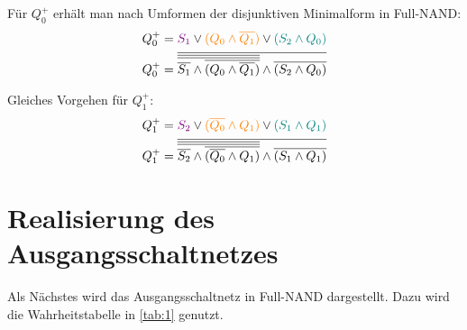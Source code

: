 \documentclass[
    paper=a4,
]{scrartcl}
\begin{document}
    \vspace*{1em}

    Für \(Q_0^+\) erhält man nach Umformen der disjunktiven Minimalform in Full-NAND:
    \begin{align*}
        Q_0^+ &= \textcolor{violet}{S_1} \vee \textcolor{orange}{(Q_0 \wedge \overline{Q_1})} \vee \textcolor{teal}{(S_2 \wedge Q_0)}\\
        Q_0^+ &= \overline{ \overline{\overline{\overline{S_1} \wedge \overline{ (Q_0 \wedge \overline{Q_1}) } }} \wedge \overline{ (S_2 \wedge Q_0) }}
    \end{align*}

    Gleiches Vorgehen für \(Q_1^+\):
    \begin{align*}
        Q_1^+ &= \textcolor{violet}{S_2} \vee \textcolor{orange}{(\overline{Q_0} \wedge Q_1)} \vee \textcolor{teal}{(S_1 \wedge Q_1)}\\
        Q_1^+ &= \overline{ \overline{\overline{\overline{S_2} \wedge \overline{ (\overline{Q_0} \wedge Q_1) }}} \wedge \overline{ (S_1 \wedge Q_1) }}
    \end{align*}
    
\section{Realisierung des Ausgangsschaltnetzes}
    Als Nächstes wird das Ausgangsschaltnetz in Full-NAND dargestellt. Dazu wird die Wahrheitstabelle in \ref{tab:1} genutzt.
\end{document}
